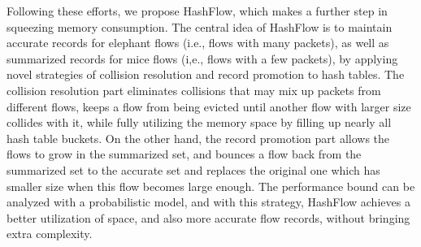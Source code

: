 


Following these efforts, we propose HashFlow, which makes a further step in squeezing memory consumption. 
The central idea of HashFlow is to  
maintain accurate records for elephant flows (i.e., flows with many packets), as well as summarized records for mice flows (i,e., flows with a few packets), 
by applying novel strategies of collision resolution and record promotion to hash tables. 
The collision resolution part eliminates collisions that may mix up packets 
from different flows, keeps a flow from being evicted until another flow with larger size collides with it, while fully utilizing the memory space by filling up nearly all hash table buckets.
On the other hand, the record promotion part allows the flows to grow in the summarized set, and bounces a flow back from the summarized set to the accurate set and replaces the original one which has smaller size when 
this flow becomes large enough. 
The performance bound can be analyzed with a probabilistic model, 
and with this strategy, HashFlow achieves a better utilization of space, 
and also more accurate flow records, without bringing extra complexity. 

